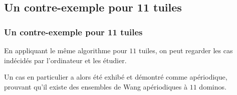 \documentclass{beamer}
\begin{document}
\subsection{Un contre-exemple pour 11 tuiles}

\begin{frame}
\frametitle{Un contre-exemple pour 11 tuiles}

En appliquant le même algorithme pour $11$ tuiles, on peut regarder les cas indécidés par l'ordinateur et les étudier.

Un cas en particulier a alors été exhibé et démontré comme apériodique, prouvant qu'il existe des ensembles de Wang
apériodiques à $11$ dominos.

\end{frame}
\end{document}
